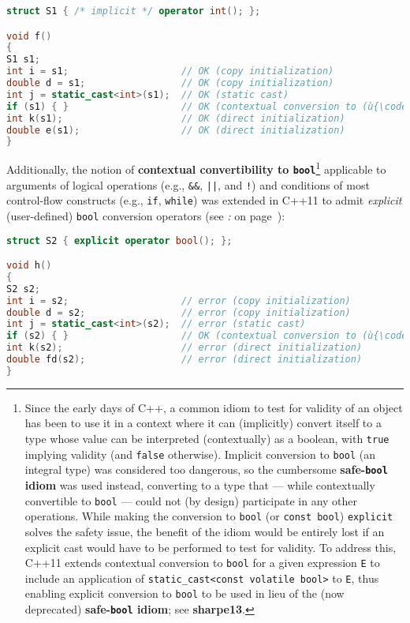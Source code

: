 \begin{lstlisting}[language=C++]
struct S1 { /* implicit */ operator int(); };

void f()
{
S1 s1;
int i = s1;                    // OK (copy initialization)
double d = s1;                 // OK (copy initialization)
int j = static_cast<int>(s1);  // OK (static cast)
if (s1) { }                    // OK (contextual conversion to (ù{\codeincomments{bool}}ù))
int k(s1);                     // OK (direct initialization)
double e(s1);                  // OK (direct initialization)
}
\end{lstlisting}

\noindent Additionally, the notion of \textbf{contextual convertibility to
\texttt{bool}}{\cprotect\footnote{Since the early days of C++, a common
idiom to test for validity of an object has been to use it in a
context where it can (implicitly) convert itself to a type whose value
can be interpreted (contextually) as a boolean, with \texttt{true}
implying validity (and \texttt{false} otherwise). Implicit conversion
to \texttt{bool} (an integral type) was considered too dangerous,
so the cumbersome \textbf{safe-\texttt{bool} idiom} was used instead,
converting to a type that --- while contextually convertible to
\texttt{bool} --- could not (by design) participate in any other
operations. While making the conversion to \texttt{bool} (or
\texttt{const}~\texttt{bool}) \texttt{explicit} solves the safety
issue, the benefit of the idiom would be entirely lost if an explicit
cast would have to be performed to test for validity. To address this,
C++11 extends contextual conversion to \texttt{bool} for a given
expression \texttt{E} to include an application of
\texttt{static\_cast<const}~\texttt{volatile}~\texttt{bool>} to
\texttt{E}, thus enabling explicit conversion to \texttt{bool} to be
used in lieu of the (now deprecated) \textbf{safe-\texttt{bool} idiom}; see
\textbf{{sharpe13}}.}} applicable to arguments of logical operations
(e.g., \texttt{\&\&}, \texttt{||}, and \texttt{!}) and conditions of
most control-flow constructs (e.g., \texttt{if}, \texttt{while}) was
extended in C++11 to admit \emph{explicit} (user-defined) \texttt{bool}
conversion operators (see {\it{}: } on page~\pageref{enabling-contextual-conversions-to-bool-as-a-test-for-validity}):

\begin{lstlisting}[language=C++]
struct S2 { explicit operator bool(); };

void h()
{
S2 s2;
int i = s2;                    // error (copy initialization)
double d = s2;                 // error (copy initialization)
int j = static_cast<int>(s2);  // error (static cast)
if (s2) { }                    // OK (contextual conversion to (ù{\codeincomments{bool}}ù))
int k(s2);                     // error (direct initialization)
double fd(s2);                 // error (direct initialization)
}
\end{lstlisting}

